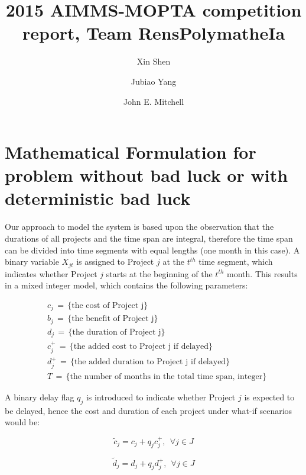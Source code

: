 \documentclass[final,3p,times]{elsarticle}
\begin{document}
\begin{frontmatter}

\title{2015 AIMMS-MOPTA competition report, Team RensPolymatheIa}

\author[rvt]{Xin Shen}
\author[rvt]{Jubiao Yang}
\author[rvt]{John E. Mitchell}

\address[rvt]{Rensselaer Polytechnic Institute, Troy, NY 12180}


\end{frontmatter}

\section{Mathematical Formulation for problem without bad luck or with deterministic bad luck}
	Our approach to model the system is based upon the observation that the durations of all projects and the time span are integral, therefore the time span can be divided into time segments with equal lengths (one month in this case). A binary variable $X_{jt}$ is assigned to Project $j$ at the $t^{th}$ time segment, which indicates whether Project $j$ starts at the beginning of the $t^{th}$ month. This results in a mixed integer model, which contains the following parameters:

	\begin{align*}
		&c_j\,=\, \{\mbox{the cost of Project j}\}\\
		&b_j\,=\, \{\mbox{the benefit of Project j}\}\\
		&d_j\,=\, \{\mbox{the duration of Project j}\}\\
		&c^+_j\,=\, \{\mbox{the added cost to Project j if delayed}\}\\
		&d^+_j\,=\, \{\mbox{the added duration to Project j if delayed}\}\\
		&T \,=\, \{\mbox{the number of months in the total time span, integer}\}
	\end{align*}
	
	A binary delay flag $q_j$ is introduced to indicate whether Project $j$ is expected to be delayed, hence the cost and duration of each project under what-if scenarios would be:
	
	\begin{equation}
		\tilde{c}_j = c_j + q_j c^+_j,~~\forall j \in J
	\end{equation}
	
	\begin{equation}
		\tilde{d}_j = d_j + q_j d^+_j,~~\forall j \in J
	\end{equation}
\end{document}
